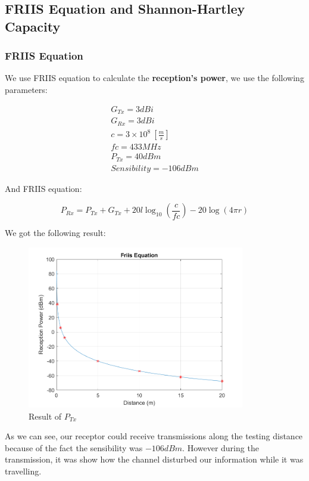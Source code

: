 \subsection{FRIIS Equation and Shannon-Hartley Capacity}
\subsubsection{FRIIS Equation}
We use FRIIS equation to calculate the \textbf{reception's power}, we use the following parameters:

\begin{align*}
	G_{Tx}= 3 dBi\\
	G_{Rx}= 3 dBi\\
	c = 3 \times 10^8 \ \left[\frac{m}{s}\right] \\
	fc = 433 MHz\\
	P_{Tx} = 40 dBm\\
	Sensibility = -106 dBm
\end{align*}

And FRIIS equation:

\begin{equation}
	P_{Rx} = P_{Tx} + G_{Tx} + 20l\log_{10}\left(\frac{c}{fc}\right) -20\log(4\pi r)
\end{equation}

We got the following result:

\begin{figure}[!htbp]
	\centering
	\includegraphics[width=9.5cm]{images/friis.png}
	\caption{Result of $P_{Tx}$}
\end{figure}

As we can see, our receptor could receive transmissions along the testing distance because of the fact the sensibility was $-106 dBm$. However during the transmission, it was show how the channel disturbed our information while it was travelling.

